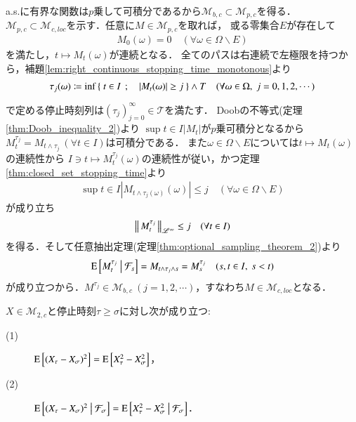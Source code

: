 	\begin{prf}
		a.s.に有界な関数は$p$乗して可積分であるから$\mathcal{M}_{b,c} \subset \mathcal{M}_{p,c}$を得る．
		$\mathcal{M}_{p,c} \subset \mathcal{M}_{c,loc}$を示す．任意に$M \in \mathcal{M}_{p,c}$を取れば，
		或る零集合$E$が存在して
		\begin{align}
			M_0(\omega) = 0 \quad (\forall \omega \in \Omega \backslash E)
		\end{align}
		を満たし，$t \longmapsto M_t(\omega)$が連続となる．
		全てのパスは右連続で左極限を持つから，補題\ref{lem:right_continuous_stopping_time_monotonous}より
		\begin{align}
			\tau_j(\omega) \coloneqq \operatorname*{inf}_{} \left\{\ t \in I\ \, ; \quad |M_t(\omega)| \geq j\ \right\} \wedge T \quad (\forall \omega \in \Omega,\ j=0,1,2,\cdots)
		\end{align}
		で定める停止時刻列は$(\tau_j)_{j=0}^{\infty} \in \mathcal{T}$を満たす．
		Doobの不等式(定理\ref{thm:Doob_inequality_2})より
		$\sup{t \in I}{|M_t|}$が$p$乗可積分となるから$M_t^{\tau_j} = M_{t \wedge \tau_j}\ (\forall t \in I)$は可積分である．
		また$\omega \in \Omega \backslash E$については$t \longmapsto M_t(\omega)$の連続性から
		$I \ni t \longmapsto M_t^{\tau_j}(\omega)$の連続性が従い，かつ定理\ref{thm:closed_set_stopping_time}より
		\begin{align}
			\sup{t \in I}{\left| M_{t \wedge \tau_j(\omega)}(\omega) \right|} \leq j
			\quad (\forall \omega \in \Omega \backslash E)
			\label{eq:M_pc_M_cloc}
		\end{align}
		が成り立ち
		\begin{align}
			\left\|\, M_t^{\tau_j}\, \right\|_{\mathscr{L}^\infty} \leq j \quad (\forall t \in I)
		\end{align}
		を得る．そして任意抽出定理(定理\ref{thm:optional_sampling_theorem_2})より
		\begin{align}
			\operatorname{E} \left[ M_t^{\tau_j} \ \middle|\ \mathcal{F}_s \right] = M_{t \wedge \tau_j \wedge s} = M_s^{\tau_j} \quad (s,t \in I,\ s < t)
		\end{align}
		が成り立つから．$M^{\tau_j} \in \mathcal{M}_{b,c}\ (j=1,2,\cdots)$，すなわち$M \in \mathcal{M}_{c,loc}$となる．
		\QED
	\end{prf}
	
	\begin{screen}
		\begin{lem}
			$X \in \mathcal{M}_{2,c}$と停止時刻$\tau \geq \sigma$に対し次が成り立つ:
			\begin{description}
				\item[(1)] $\operatorname{E} \left[ (X_{\tau} - X_{\sigma})^2 \right] = \operatorname{E} \left[ X_{\tau}^2 - X_{\sigma}^2 \right]$，
				\item[(2)] $\operatorname{E} \left[ (X_{\tau} - X_{\sigma})^2 \ \middle|\ \mathcal{F}_\sigma \right] = \operatorname{E} \left[ X_{\tau}^2 - X_{\sigma}^2 \ \middle|\ \mathcal{F}_\sigma \right]$．
			\end{description}
			\label{lem:stopping_time_telescopic_sum}
		\end{lem}
	\end{screen}
	
